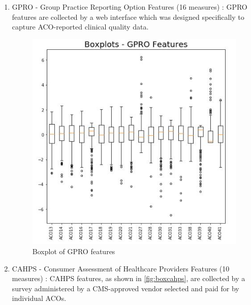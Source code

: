 \documentclass[conference]{IEEEtran}
\begin{document}
\begin{enumerate}
\item GPRO - Group Practice Reporting Option Features (16 measures) : GPRO features are collected by a web interface which was designed specifically to capture ACO-reported clinical quality data.

\begin{figure}[H]
    \centering
    \includegraphics{BoxPlots_GPRO.jpg}
    \caption{Boxplot of GPRO features}
    \label{fig:boxgpro}
\end{figure}


\item CAHPS - Consumer Assessment of Healthcare Providers Features (10 measures) : CAHPS features, as shown in \ref{fig:boxcahps}, are collected by a survey administered by a CMS-approved vendor selected and paid for by individual ACOs.


\end{enumerate}
\end{document}
